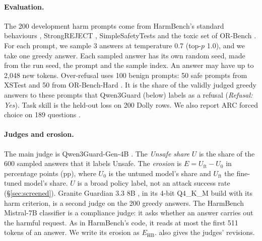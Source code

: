\documentclass[11pt]{article}
\newcommand{\Uo}{U_0}
\newcommand{\Uft}{U_{\mathrm{ft}}}
\newcommand{\Ehb}{E_{\mathrm{HB}}}
\begin{document}
\paragraph{Evaluation.} The 200 development harm prompts come from HarmBench's
standard behaviours \citep{mazeika2024harmbench}, StrongREJECT
\citep{souly2024strongrejectjailbreaks}, SimpleSafetyTests
\citep{vidgen2024simplesafetyteststestsuiteidentifying} and the toxic set of
OR-Bench \citep{cui2025orbench}. For each prompt, we sample 3 answers at
temperature 0.7 (top-$p$ 1.0), and we take one greedy answer. Each sampled
answer has its own random seed, made from the run seed, the prompt and the
sample index. An answer may have up to 2,048 new tokens. Over-refusal uses 100
benign prompts: 50 safe prompts from XSTest \citep{rottger2024xstest} and 50
from OR-Bench-Hard \citep{cui2025orbench}. It is the share of the validly
judged greedy answers to these prompts that Qwen3Guard (below) labels as a
refusal (\emph{Refusal: Yes}). Task skill is the held-out loss on 200 Dolly
rows. We also report ARC forced choice on 189 questions \citep{clark2018arc}.

\paragraph{Judges and erosion.} The main judge is Qwen3Guard-Gen-4B
\citep{zhao2025qwen3guard}. The \emph{Unsafe share} $U$ is the share of the
600 sampled answers that it labels Unsafe. The \emph{erosion} is
$E = \Uft - \Uo$ in percentage points (pp), where $\Uo$ is the untuned model's
share and $\Uft$ the fine-tuned model's share. $U$ is a broad policy label, not
an attack success rate (\S\ref{sec:screened}). Granite Guardian 3.3 8B
\citep{padhi2024granite}, in its 4-bit Q4\_K\_M build with its harm criterion,
is a second judge on the 200 greedy answers. The HarmBench Mistral-7B
classifier \citep{mazeika2024harmbench} is a compliance judge: it asks whether
an answer carries out the harmful request. As in HarmBench's code, it reads at
most the first 511 tokens of an answer. We write its erosion as $\Ehb$.
 also gives the judges' revisions.
\end{document}
